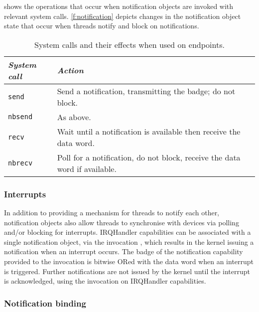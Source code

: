  shows the operations that occur when notification objects are
invoked with relevant system calls. \cref{f:notification} depicts changes in the notification object
state that occur when threads notify and block on notifications. 

\begin{table} 
    \centering
    \begin{tabularx}{\textwidth}{lX}\toprule
        \emph{System call} & \emph{Action} \\\midrule
        \texttt{send}   & Send a notification, transmitting the badge; do not block. \\ 
        \texttt{nbsend} & As above. \\
        \texttt{recv}   & Wait until a notification is available then receive the data word.  \\
        \texttt{nbrecv} & Poll for a notification, do not block, receive the data word if available. \\
        \bottomrule
    \end{tabularx}
    \caption{System calls and their effects when used on endpoints.}
    \label{t:notification-system-calls}
\end{table}


\subsubsection{Interrupts}

In addition to providing a mechanism for threads to notify each other, notification objects 
also allow threads to synchronise with devices via polling and/or blocking for interrupts. 
IRQHandler capabilities can be associated with a single notification object, via the invocation
, which results in the kernel issuing a notification when an interrupt
occurs. The badge of the notification capability provided to the invocation is bitwise ORed with the
data word when an interrupt is triggered. Further notifications are not issued by the kernel
until the interrupt is acknowledged, using the  invocation on IRQHandler
capabilities.

\subsubsection{Notification binding}
\label{s:notification-binding}

